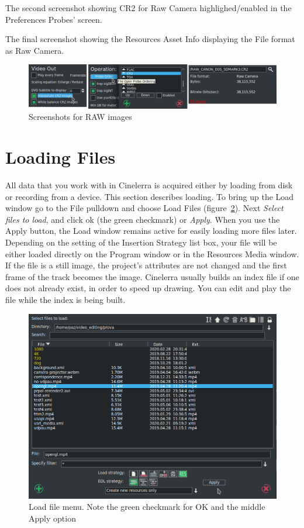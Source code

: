 The second screenshot showing CR2 for Raw Camera highlighed/enabled in the Preferences Probes’ screen.

The final screenshot showing the Resources Asset Info displaying the File format as Raw Camera.

\begin{figure}[htpb]
    \centering
    \includegraphics[width=0.95\linewidth]{images/raw.png}
    \caption{Screenshots for RAW images}
    \label{fig:raw}
\end{figure}

\section{Loading Files}%
\label{sec:loading_files}

All data that you work with in Cinelerra is acquired either by loading from disk or recording from a device. This section describes loading.  To bring up the Load window go to the File pulldown and choose Load Files  (figure~\ref{fig:load}).  Next \textit{Select files to load}, and click ok (the green checkmark) or \textit{Apply}. When you use the Apply button, the Load window remains active for easily loading more files later.  Depending on the setting of the Insertion Strategy list box, your file will be either loaded directly on the Program window or in the Resources Media window.  If the file is a still image, the project's attributes are not changed and the first frame of the track becomes the image. Cinelerra usually builds an index file if one does not already exist, in order to speed up drawing. You can edit and play the file while the index is being built.

\begin{figure}[htpb]
    \centering
    \includegraphics[width=0.8\linewidth]{images/load.png}
    \caption{Load file menu.  Note the green checkmark for OK and the middle Apply option}
    \label{fig:load}
\end{figure}

